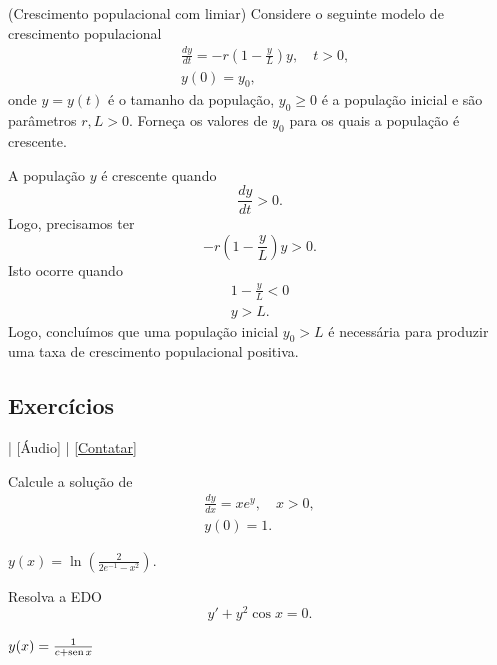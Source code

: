 \begin{exeresol}(Crescimento populacional com limiar)
  Considere o seguinte modelo de crescimento populacional
  \begin{align*}
    &\frac{dy}{dt} = -r\left(1 - \frac{y}{L}\right)y,\quad t>0,\\
    &y(0) = y_0,
  \end{align*}
  onde $y = y(t)$ é o tamanho da população, $y_0 \geq 0$ é a população inicial e são parâmetros $r, L > 0$. Forneça os valores de $y_0$ para os quais a população é crescente.
\end{exeresol}
\begin{resol}
  A população $y$ é crescente quando
  \begin{equation}
    \frac{dy}{dt} > 0.
  \end{equation}
  Logo, precisamos ter
  \begin{equation}
    -r\left(1 - \frac{y}{L}\right)y > 0.
  \end{equation}
  Isto ocorre quando
  \begin{gather}
    1 - \frac{y}{L} < 0 \\
    y > L.
  \end{gather}
  Logo, concluímos que uma população inicial $y_0 > L$ é necessária para produzir uma taxa de crescimento populacional positiva.
\end{resol}

\subsection*{Exercícios}

\begin{flushright}
  [Vídeo] | [Áudio] | \href{https://phkonzen.github.io/notas/contato.html}{[Contatar]}
\end{flushright}

\begin{exer}
  Calcule a solução de
  \begin{align}
    \frac{dy}{dx} = xe^y,\quad x>0,\\
    y(0) = 1.
  \end{align}
\end{exer}
\begin{resp}
  $y(x) = \ln\left(\frac{2}{2e^{-1}-x^2}\right)$.
\end{resp}

\begin{exer}
  Resolva a EDO
  \begin{equation}
    y' + y^2\cos x = 0.
  \end{equation}
\end{exer}
\begin{resp}
  $y(x) = \frac{1}{c + \operatorname{sen} x}$
\end{resp}

